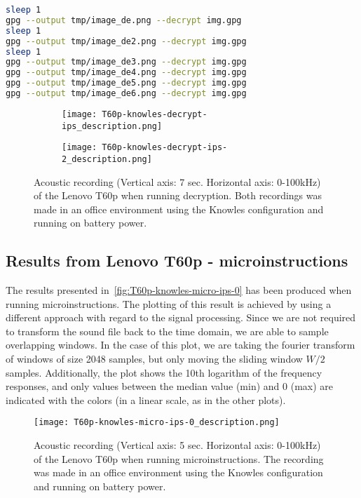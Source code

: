 \begin{lstlisting}[language=BASH, caption={Decryption of an image file.}, 
label={lst:decryption_loop}]
sleep 1             
gpg --output tmp/image_de.png --decrypt img.gpg
sleep 1
gpg --output tmp/image_de2.png --decrypt img.gpg
sleep 1
gpg --output tmp/image_de3.png --decrypt img.gpg
gpg --output tmp/image_de4.png --decrypt img.gpg    
gpg --output tmp/image_de5.png --decrypt img.gpg
gpg --output tmp/image_de6.png --decrypt img.gpg
\end{lstlisting}

\begin{figure}[ht]
    \begin{subfigure}{1\textwidth}
        \centering
        \texttt{[image: T60p-knowles-decrypt-ips\_description.png]}
        \caption{}
        \label{fig:T60p-knowles-decrypt-ips}
    \end{subfigure}
    \begin{subfigure}{1\textwidth}
        \centering
        \texttt{[image: T60p-knowles-decrypt-ips-2\_description.png]}
        \caption{}
        \label{fig:T60p-knowles-decrypt-ips-2}
    \end{subfigure}
    \caption{Acoustic recording (Vertical axis: 7 sec. Horizontal axis: 0-100kHz) of the Lenovo T60p when running decryption.
    Both recordings was made in an office environment using the Knowles configuration and running on battery power. }
    \label{fig:T60p-knowles-decrypt-ips}
\end{figure}

\subsection{Results from Lenovo T60p - microinstructions}\label{chp5:subsec:t60p_knowles_results_micro}
The results presented in~\autoref{fig:T60p-knowles-micro-ips-0} has been produced when running microinstructions.
The plotting of this result is achieved by using a different approach with regard to the signal processing. 
Since we are not required to transform the sound file back to the time domain, we are able to sample overlapping windows.
In the case of this plot, we are taking the fourier transform of windows of size 2048 samples, but only moving the sliding window \({W/2}\) samples.
Additionally, the plot shows the 10th logarithm of the frequency responses, and only values between the median value (min) and 0 (max) are indicated with the colors (in a linear scale, as in the other plots). 
\begin{figure}[ht]
    \centering
    \texttt{[image: T60p-knowles-micro-ips-0\_description.png]}
    \caption{Acoustic recording (Vertical axis: 5 sec. Horizontal axis: 0-100kHz) of the Lenovo T60p when running microinstructions. The recording was made in an office environment using the Knowles configuration and running on battery power. }
    \label{fig:T60p-knowles-micro-ips-0}
\end{figure}
